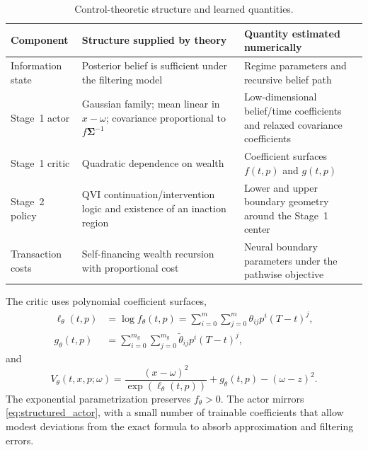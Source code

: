 \documentclass[a4paper,10pt]{article}
\newcommand{\bSigma}{\bm{\Sigma}}
\begin{document}
\begin{table}[H]
\centering
\small
\caption{Control-theoretic structure and learned quantities.}
\label{tab:theory_learning_map}
\begin{tabular}{>{\raggedright\arraybackslash}p{} >{\raggedright\arraybackslash}p{} >{\raggedright\arraybackslash}p{}}
\toprule
Component & Structure supplied by theory & Quantity estimated numerically \\
\midrule
Information state & Posterior belief is sufficient under the filtering model & Regime parameters and recursive belief path \\
Stage~1 actor & Gaussian family; mean linear in $x-\omega$; covariance proportional to $f\bSigma^{-1}$ & Low-dimensional belief/time coefficients and relaxed covariance coefficients \\
Stage~1 critic & Quadratic dependence on wealth & Coefficient surfaces $f(t,p)$ and $g(t,p)$ \\
Stage~2 policy & QVI continuation/intervention logic and existence of an inaction region & Lower and upper boundary geometry around the Stage~1 center \\
Transaction costs & Self-financing wealth recursion with proportional cost & Neural boundary parameters under the pathwise objective \\
\bottomrule
\end{tabular}
\end{table}

The critic uses polynomial coefficient surfaces,
\begin{align}
\ell_\theta(t,p)&=\log f_\theta(t,p)
=\sum_{i=0}^{m}\sum_{j=0}^{m}\theta_{ij}p^i(T-t)^j,\\
g_\theta(t,p)&=\sum_{i=0}^{m_g}\sum_{j=0}^{m_g}\widetilde\theta_{ij}p^i(T-t)^j,
\end{align}
and
\begin{equation}
V_\theta(t,x,p;\omega)
=\frac{(x-\omega)^2}{\exp(\ell_\theta(t,p))}
+g_\theta(t,p)-(\omega-z)^2.
\label{eq:critic}
\end{equation}
The exponential parametrization preserves $f_\theta>0$. The actor mirrors \eqref{eq:structured_actor}, with a small number of trainable coefficients that allow modest deviations from the exact formula to absorb approximation and filtering errors.
\end{document}
